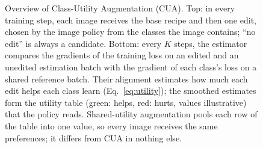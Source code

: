 \begin{figure}[t]
\caption{Overview of Class-Utility Augmentation (CUA). Top: in every training step, each image receives the base recipe and then one edit, chosen by the image policy from the classes the image contains; ``no edit'' is always a candidate. Bottom: every $K$ steps, the estimator compares the gradients of the training loss on an edited and an unedited estimation batch with the gradient of each class's loss on a shared reference batch. Their alignment estimates how much each edit helps each class learn (Eq.~\eqref{eq:utility}); the smoothed estimates form the utility table (green: helps, red: hurts, values illustrative) that the policy reads. Shared-utility augmentation pools each row of the table into one value, so every image receives the same preferences; it differs from CUA in nothing else.}
\label{fig:framework}
\end{figure}

